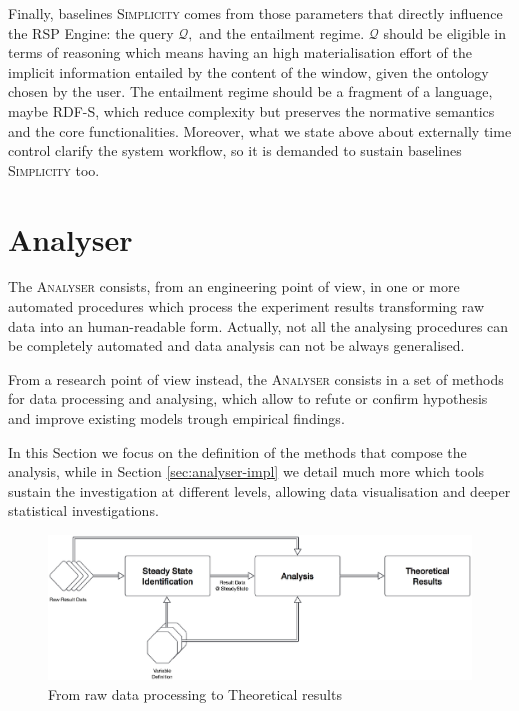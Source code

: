 Finally, baselines \textsc{Simplicity} comes from those parameters that directly influence the RSP Engine: the query $\mathcal{Q},$ and the entailment regime. $\mathcal{Q}$ should be eligible in terms of reasoning which means having an high materialisation effort of the implicit information entailed by the content of the window, given the ontology chosen by the user. The entailment regime should be a fragment of a language, maybe RDF-S,  which reduce complexity but preserves the normative semantics and the core functionalities. Moreover, what we state above about externally time control clarify the system workflow, so it is demanded to sustain baselines \textsc{Simplicity} too.

\section{Analyser}\label{sec:analyser}

The \textsc{Analyser} consists, from an engineering point of view, in one or more automated procedures which process the experiment results transforming raw data into an human-readable form. Actually, not all the analysing procedures can be completely automated and data analysis can not be always generalised. 

From a research point of view instead, the \textsc{Analyser} consists in a set of methods for data processing and analysing, which allow to refute or confirm hypothesis and improve existing models trough empirical findings.

In this Section we focus on the definition of the methods that compose the analysis, while in Section \ref{sec:analyser-impl} we detail much more which tools sustain the investigation at different levels, allowing data visualisation and deeper statistical investigations. \\

\begin{figure}[tbh]
  \centering
	\includegraphics[width=\linewidth]{images/analyser-block-schema}
	\caption{From raw data processing to Theoretical results} 
  	\label{fig:analyser-block-schema}
\end{figure}

